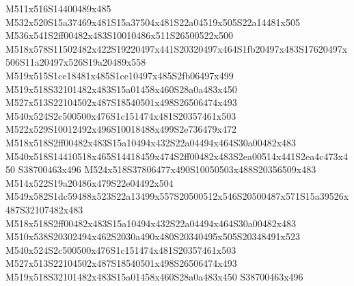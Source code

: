 \documentclass{article}
\begin{document}
\begin{multicols}{2}
M511x516S14400489x485 M532x520S15a37469x481S15a37504x481S22a04519x505S22a14481x505 M536x541S2ff00482x483S10010486x511S26500522x500 M518x578S11502482x422S19220497x441S20320497x464S1fb20497x483S17620497x506S11a20497x526S19a20489x558 M519x515S1ce18481x485S1ce10497x485S2fb06497x499 M519x518S32101482x483S15a01458x460S28a0a483x450 M527x513S22104502x487S18540501x498S26506474x493 M540x524S2c500500x476S1c151474x481S20357461x503 M522x529S10012492x496S10018488x499S2e736479x472 M518x518S2ff00482x483S15a10494x432S22a04494x464S30a00482x483 M540x518S14410518x465S14418459x474S2ff00482x483S2ea00514x441S2ea4c473x450 S38700463x496 M524x518S37806477x490S10050503x488S20356509x483 M514x522S19a20486x479S22e04492x504 M549x582S1dc59488x523S22a13499x557S20500512x546S20500487x571S15a39526x487S32107482x483 M518x518S2ff00482x483S15a10494x432S22a04494x464S30a00482x483 M510x538S20302494x462S2030a490x480S20340495x505S20348491x523 M540x524S2c500500x476S1c151474x481S20357461x503 M527x513S22104502x487S18540501x498S26506474x493 M519x518S32101482x483S15a01458x460S28a0a483x450 S38700463x496


\end{multicols}
\end{document}
